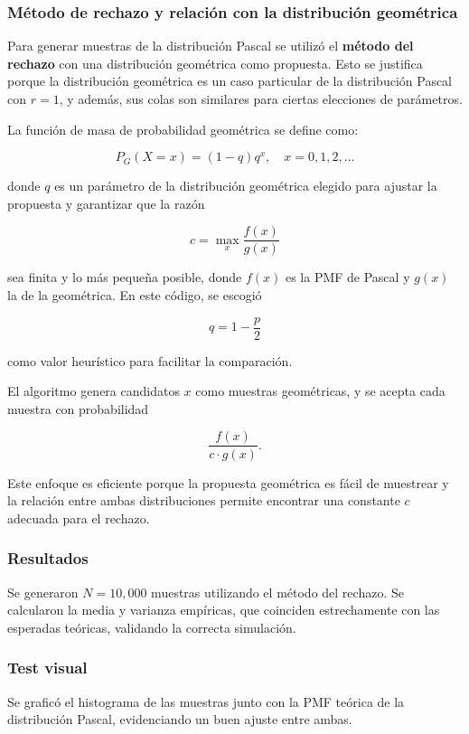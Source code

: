 \documentclass{article}
\begin{document}
\subsubsection{Método de rechazo y relación con la distribución geométrica}

Para generar muestras de la distribución Pascal se utilizó el \textbf{método del rechazo} con una distribución geométrica como propuesta. Esto se justifica porque la distribución geométrica es un caso particular de la distribución Pascal con $r=1$, y además, sus colas son similares para ciertas elecciones de parámetros.

La función de masa de probabilidad geométrica se define como:

\[
P_G(X = x) = (1 - q) q^x, \quad x=0,1,2,\ldots
\]

donde $q$ es un parámetro de la distribución geométrica elegido para ajustar la propuesta y garantizar que la razón

\[
c = \max_x \frac{f(x)}{g(x)}
\]

sea finita y lo más pequeña posible, donde $f(x)$ es la PMF de Pascal y $g(x)$ la de la geométrica. En este código, se escogió

\[
q = 1 - \frac{p}{2}
\]

como valor heurístico para facilitar la comparación.

El algoritmo genera candidatos $x$ como muestras geométricas, y se acepta cada muestra con probabilidad

\[
\frac{f(x)}{c \cdot g(x)}.
\]

Este enfoque es eficiente porque la propuesta geométrica es fácil de muestrear y la relación entre ambas distribuciones permite encontrar una constante $c$ adecuada para el rechazo.

\subsubsection{Resultados}

Se generaron $N=10{,}000$ muestras utilizando el método del rechazo. Se calcularon la media y varianza empíricas, que coinciden estrechamente con las esperadas teóricas, validando la correcta simulación.

\subsubsection{Test visual}

Se graficó el histograma de las muestras junto con la PMF teórica de la distribución Pascal, evidenciando un buen ajuste entre ambas.
\end{document}

